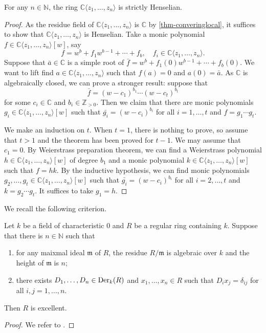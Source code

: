 \begin{thm}\label{thm-convpowerstrictHen}
    For any $n\in \mathbb{N}$, the ring $\mathbb{C}\langle z_1,\ldots,z_n \rangle$ is strictly Henselian.
\end{thm}
\begin{proof}
    As the residue field of $\mathbb{C}\langle z_1,\ldots,z_n \rangle$ is $\mathbb{C}$ by \cref{thm-converinglocal}, it suffices to show that $\mathbb{C}\langle z_1,\ldots,z_n \rangle$ is Henselian. Take a monic polynomial $f\in \mathbb{C}\langle z_1,\ldots,z_n \rangle[w]$, say
    \[
        f=w^b+f_1 w^{b-1}+\cdots+ f_b,\quad f_i\in \mathbb{C}\langle z_1,\ldots,z_n \rangle.
    \]
    Suppose that $\bar{a}\in \mathbb{C}$ is a simple root of $\bar{f}=w^b+f_1(0)w^{b-1}+\cdots+ f_b(0)$. We want to lift find $a\in \mathbb{C}\langle z_1,\ldots,z_n \rangle$ such that $f(a)=0$ and $a(0)=\bar{a}$. As $\mathbb{C}$ is algebraically closed, we can prove a stronger result: suppose that 
    \[
        \bar{f}=(w-c_1)^{b_1}\cdots (w-c_t)^{b_t}  
    \]
    for some $c_i\in \mathbb{C}$ and $b_i\in \mathbb{Z}_{>0}$. Then we claim that there are monic polynomials $g_i\in \mathbb{C}\langle z_1,\ldots,z_n \rangle[w]$ such that $\bar{g_i}=(w-c_i)^{b_i}$ for all $i=1,\ldots,t$ and $f=g_1\cdots g_t$.

    We make an induction on $t$. When $t=1$, there is nothing to prove, so assume that $t>1$ and the theorem has been proved for $t-1$. We may assume that $c_1=0$. By Weierstrass preparation theorem, we can find a Weierstrass polynomial $h\in \mathbb{C}\langle z_1,\ldots,z_n \rangle[w]$ of degree $b_1$ and a monic polynomial $k\in \mathbb{C}\langle z_1,\ldots,z_n \rangle[w]$ such that $f=hk$. By the inductive hypothesis, we can find monic polynomials $g_2,\ldots,g_t\in \mathbb{C}\langle z_1,\ldots,z_n \rangle[w]$ such that  $\bar{g_i}=(w-c_i)^{b_i}$ for all $i=2,\ldots,t$ and $k=g_2\cdots g_t$. It suffices to take $g_1=h$.
\end{proof}

We recall the following criterion.
\begin{thm}\label{thm-excefromderiv}
    Let $k$ be a field of characteristic $0$ and $R$ be a regular ring containing $k$. Suppose that there is $n\in \mathbb{N}$ such that
    \begin{enumerate}
        \item for any maixmal ideal $\mathfrak{m}$ of $R$, the residue $R/\mathfrak{m}$ is algebraic over $k$ and the height of $\mathfrak{m}$ is $n$;
        \item there exists $D_1,\ldots, D_n\in \operatorname{Der}_k(R)$ and $x_1,\ldots,x_n\in R$ such that $D_ix_j=\delta_{ij}$ for all $i,j=1,\ldots,n$. 
    \end{enumerate}
    Then $R$ is excellent.
\end{thm}
\begin{proof}
    We refer to \cite[Theorem~102]{Mat80}.
\end{proof}

